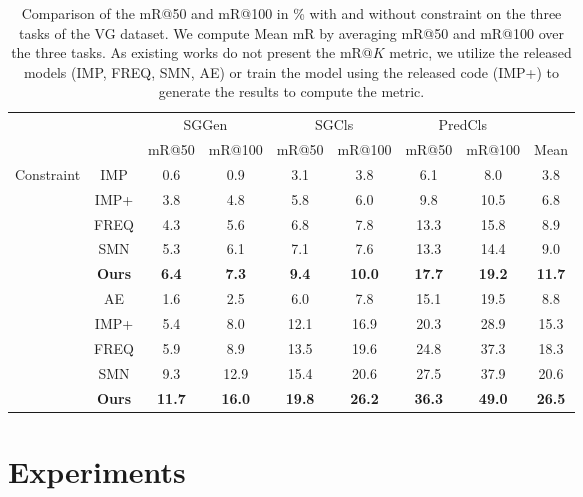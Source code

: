 \documentclass[10pt,twocolumn,letterpaper]{article}
\begin{document}
\begin{table*}[!t]
\centering
\small
\begin{tabular}{c|c|cc|cc|cc|c}
\hline
\multirow{2}{*}{} & \centering \multirow{2}{*}{Method} & \multicolumn{2}{|c|}{SGGen}  & \multicolumn{2}{c|}{SGCls} & \multicolumn{2}{c|}{PredCls}  \\
 & & mR@50 & mR@100   & mR@50 & mR@100 &   mR@50 & mR@100 & Mean  \\
\hline
\hline
\multirow{6}{*}{Constraint} 
& \centering IMP \cite{xu2017scene} &  0.6   & 0.9 &  3.1 & 3.8 & 6.1 & 8.0 & 3.8 \\
& \centering IMP+ \cite{xu2017scene,zellers2017neural} &   3.8 & 4.8 & 5.8 & 6.0 & 9.8 & 10.5 & 6.8 \\
& \centering FREQ \cite{zellers2017neural} & 4.3 & 5.6 & 6.8 & 7.8 & 13.3 & 15.8 & 8.9\\
& \centering SMN \cite{zellers2017neural} & 5.3 & 6.1 & 7.1 & 7.6 & 13.3 & 14.4 & 9.0\\
& \centering \textbf{Ours} & \textbf{6.4} & \textbf{7.3} & \textbf{9.4} & \textbf{10.0} & \textbf{17.7} & \textbf{19.2} & \textbf{11.7}\\
\hline
\multirow{5}{*}{Unconstraint} 
& \centering AE \cite{newell2017pixels} & 1.6 & 2.5 & 6.0 & 7.8 & 15.1 & 19.5 & 8.8 \\
& \centering IMP+ \cite{xu2017scene,zellers2017neural} & 5.4 & 8.0 &  12.1 & 16.9 & 20.3 & 28.9 & 15.3\\
& \centering FREQ \cite{zellers2017neural} & 5.9 & 8.9 & 13.5 & 19.6 & 24.8 & 37.3 & 18.3 \\
& \centering SMN \cite{zellers2017neural} &9.3 & 12.9 & 15.4 & 20.6 & 27.5 & 37.9 & 20.6 \\
& \centering \textbf{Ours}  & \textbf{11.7} & \textbf{16.0} & \textbf{19.8} & \textbf{26.2} & \textbf{36.3} & \textbf{49.0} & \textbf{26.5}\\
\hline
\end{tabular}
\caption{Comparison of the mR@50 and mR@100 in \% with and without constraint on the three tasks of the VG dataset. We compute Mean mR by averaging mR@50 and mR@100 over the three tasks. As existing works do not present the mR@$K$ metric, we utilize the released models (IMP, FREQ, SMN, AE) or train the model using the released code (IMP+) to generate the results to compute the metric.}
\label{table:vg-mrk-sota}
\end{table*}

\section{Experiments}
\end{document}
